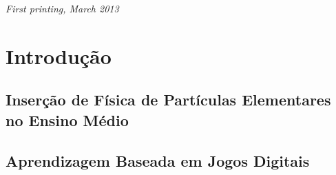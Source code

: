 \documentclass[12pt,fleqn]{book} %
\begin{document}
\noindent \textit{First printing, March 2013} %




\pagestyle{empty} %

\tableofcontents %

\cleardoublepage %

\pagestyle{fancy} %





\chapter{Introdução}

\lipsum[1-2] %

\section{Inserção de Física de Partículas Elementares no Ensino Médio}

\lipsum[1-7] %


\section{Aprendizagem Baseada em Jogos Digitais}
\end{document}
